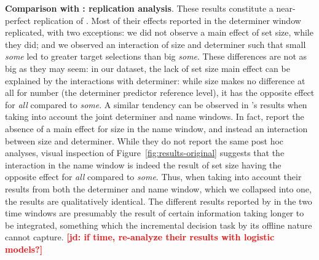 \documentclass[10pt,letterpaper]{article}
\newcommand{\figref}[1]{Figure~\ref{#1}}
\newcommand{\jd}[1]{\textcolor{Red}{\textbf{[jd: #1]}}}
\begin{document}



\textbf{Comparison with : replication analysis}. These results constitute a near-perfect replication of  . Most of their effects reported in the determiner window replicated, with two exceptions: we did not observe a main effect of set size, while they did; and we observed an interaction of size and determiner such that small \emph{some} led to greater target selections than big \emph{some}. These differences are not as big as they may seem: in our dataset, the lack of set size main effect can be explained by the interactions with determiner: while size makes no difference at all for number (the determiner predictor reference level), it has the opposite effect for \emph{all} compared to \emph{some}. A similar tendency can be observed in  's results when taking into account the joint determiner and name windows. In fact,   report the absence of a main effect for size in the name window, and instead an interaction between size and determiner. While they do not report the same post hoc analyses, visual inspection of \figref{fig:results-original} suggests that the interaction in the name window is indeed the result of set size having the opposite effect for \emph{all} compared to \emph{some}. Thus, when taking into account their results from both the determiner and name window, which we collapsed into one, the results are qualitatively identical. The different results reported by   in the two time windows are presumably the result of certain information taking longer to be integrated, something which the incremental decision task by its offline nature cannot capture. \jd{if time, re-analyze their results with logistic models?}
\end{document}
